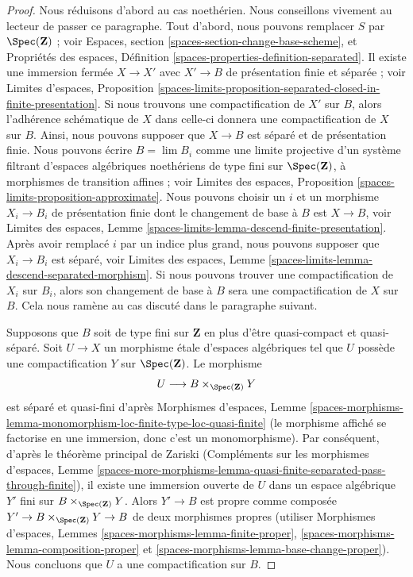 \begin{proof}
Nous réduisons d'abord au cas noethérien. Nous conseillons vivement au lecteur de passer ce paragraphe. Tout d'abord, nous pouvons remplacer $S$ par $\Spec(\mathbf{Z})$ ; voir Espaces, section \ref{spaces-section-change-base-scheme}, et Propriétés des espaces, Définition \ref{spaces-properties-definition-separated}. Il existe une immersion fermée $X \to X'$ avec $X' \to B$ de présentation finie et séparée ; voir Limites d'espaces, Proposition \ref{spaces-limits-proposition-separated-closed-in-finite-presentation}. Si nous trouvons une compactification de $X'$ sur $B$, alors l'adhérence schématique de $X$ dans celle-ci donnera une compactification de $X$ sur $B$. Ainsi, nous pouvons supposer que $X \to B$ est séparé et de présentation finie. Nous pouvons écrire $B = \lim B_i$ comme une limite projective d'un système filtrant d'espaces algébriques noethériens de type fini sur $\Spec(\mathbf{Z})$, à morphismes de transition affines ; voir Limites des espaces, Proposition \ref{spaces-limits-proposition-approximate}.  
Nous pouvons choisir un $i$ et un morphisme $X_i \to B_i$ de présentation finie dont le changement de base à $B$ est $X \to B$, voir Limites des espaces, Lemme \ref{spaces-limits-lemma-descend-finite-presentation}.  
Après avoir remplacé $i$ par un indice plus grand, nous pouvons supposer que $X_i \to B_i$ est séparé, voir Limites des espaces, Lemme \ref{spaces-limits-lemma-descend-separated-morphism}.  
Si nous pouvons trouver une compactification de $X_i$ sur $B_i$, alors son changement de base à $B$ sera une compactification de $X$ sur $B$.  
Cela nous ramène au cas discuté dans le paragraphe suivant.

\medskip\noindent
Supposons que $B$ soit de type fini sur $\mathbf{Z}$ en plus d'être quasi-compact et quasi-séparé. Soit $U \to X$ un morphisme \'etale d'espaces algébriques tel que $U$ possède une compactification $Y$ sur $\Spec(\mathbf{Z})$. Le morphisme $$
U \longrightarrow B \times_{\Spec(\mathbf{Z})} Y
$$ est séparé et quasi-fini d'après Morphismes d'espaces, Lemme \ref{spaces-morphisms-lemma-monomorphism-loc-finite-type-loc-quasi-finite} (le morphisme affiché se factorise en une immersion, donc c'est un monomorphisme). Par conséquent, d'après le théorème principal de Zariski (Compléments sur les morphismes d'espaces, Lemme \ref{spaces-more-morphisms-lemma-quasi-finite-separated-pass-through-finite}), il existe une immersion ouverte de $U$ dans un espace algébrique $Y'$ fini sur $B \times_{\Spec(\mathbf{Z})} Y$. Alors $Y' \to B$ est propre comme composée $Y' \to B \times_{\Spec(\mathbf{Z})} Y \to B$ de deux morphismes propres (utiliser Morphismes d'espaces, Lemmes \ref{spaces-morphisms-lemma-finite-proper}, \ref{spaces-morphisms-lemma-composition-proper} et \ref{spaces-morphisms-lemma-base-change-proper}). Nous concluons que $U$ a une compactification sur $B$.


\end{proof}
